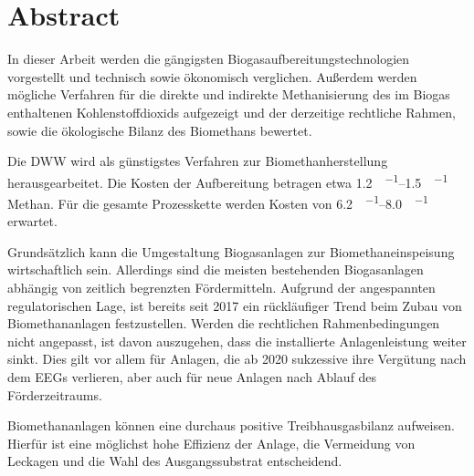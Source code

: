 
\section*{Abstract}

\forceindent In dieser Arbeit werden die gängigsten Biogasaufbereitungstechnologien vorgestellt und technisch sowie ökonomisch verglichen. Außerdem werden mögliche Verfahren für die direkte und indirekte Methanisierung des im Biogas enthaltenen Kohlenstoffdioxids aufgezeigt und der derzeitige rechtliche Rahmen, sowie die ökologische Bilanz des Biomethans bewertet. \smallskip

\forceindent Die \gls{DWW} wird als günstigstes Verfahren zur Biomethanherstellung herausgearbeitet. Die Kosten der Aufbereitung betragen etwa \SIrange{1,2}{1,5}{\ct\per\kwh} Methan. Für die gesamte Prozesskette werden Kosten von \SIrange{6,2}{8,0}{\ct\per\kwh} erwartet. \smallskip

\forceindent Grundsätzlich kann die Umgestaltung Biogasanlagen zur Biomethaneinspeisung wirtschaftlich sein. Allerdings sind die meisten bestehenden Biogasanlagen abhängig von zeitlich begrenzten Fördermitteln. Aufgrund der angespannten regulatorischen Lage, ist bereits seit \SI{2017}{\relax} ein rückläufiger Trend beim Zubau von Biomethananlagen festzustellen. Werden die rechtlichen Rahmenbedingungen nicht angepasst, ist davon auszugehen, dass die installierte Anlagenleistung weiter sinkt. Dies gilt vor allem für Anlagen, die ab \SI{2020}{\relax} sukzessive ihre Vergütung nach dem \glspl{EEG} verlieren, aber auch für neue Anlagen nach Ablauf des Förderzeitraums. \smallskip

\forceindent Biomethananlagen können eine durchaus positive Treibhausgasbilanz aufweisen. Hierfür ist eine möglichst hohe Effizienz der Anlage, die Vermeidung von Leckagen und die Wahl des Ausgangssubstrat entscheidend.